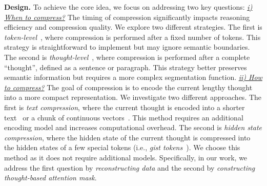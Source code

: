 \textbf{Design.}
To achieve the core idea, we focus on addressing two key questions:
\underline{\textit{i) When to compress?}} 
The timing of compression significantly impacts reasoning efficiency and compression quality. 
We explore two different strategies.
The first is \textit{token-level}~\citep{iclr25_activation_beacon}, where compression is performed after a fixed number of tokens.
This strategy is straightforward to implement but may ignore semantic boundaries.
The second is \textit{thought-level}~\citep{acl24_anllm}, where compression is performed after a complete ``thought'', defined as a sentence or paragraph.
This strategy better preserves semantic information but requires a more complex segmentation function.
\underline{\textit{ii) How to compress?}}
The goal of compression is to encode the current lengthy thought into a more compact representation.
We investigate two different approaches.
The first is \textit{text compression}, where the current thought is encoded into a shorter text~\citep{emnlp23_llmlingua} or a chunk of continuous vectors~\citep{emnlp23_autocompressors,iclr24_icae}.
This method requires an additional encoding model and increases computational overhead.
The second is \textit{hidden state compression}, where the hidden state of the current thought is compressed into the hidden states of a few special tokens (i.e., \textit{gist tokens}~\citep{nips23_gist}).
We choose this method as it does not require additional models.
Specifically, in our work, we address the first question by \textit{reconstructing data} and the second by \textit{constructing thought-based attention mask}.



\subsection{\ours}

